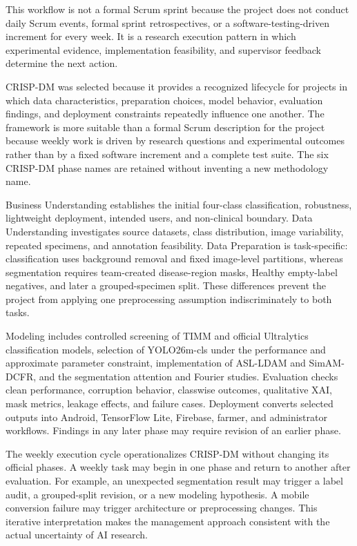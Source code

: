 \documentclass[12pt,a4paper]{report}
\begin{document}
This workflow is not a formal Scrum sprint because the project does not conduct daily Scrum events, formal sprint retrospectives, or a software-testing-driven increment for every week. It is a research execution pattern in which experimental evidence, implementation feasibility, and supervisor feedback determine the next action.\par
CRISP-DM was selected because it provides a recognized lifecycle for projects in which data characteristics, preparation choices, model behavior, evaluation findings, and deployment constraints repeatedly influence one another. The framework is more suitable than a formal Scrum description for the project because weekly work is driven by research questions and experimental outcomes rather than by a fixed software increment and a complete test suite. The six CRISP-DM phase names are retained without inventing a new methodology name.\par
Business Understanding establishes the initial four-class classification, robustness, lightweight deployment, intended users, and non-clinical boundary. Data Understanding investigates source datasets, class distribution, image variability, repeated specimens, and annotation feasibility. Data Preparation is task-specific: classification uses background removal and fixed image-level partitions, whereas segmentation requires team-created disease-region masks, Healthy empty-label negatives, and later a grouped-specimen split. These differences prevent the project from applying one preprocessing assumption indiscriminately to both tasks.\par
Modeling includes controlled screening of TIMM and official Ultralytics classification models, selection of YOLO26m-cls under the performance and approximate parameter constraint, implementation of ASL-LDAM and SimAM-DCFR, and the segmentation attention and Fourier studies. Evaluation checks clean performance, corruption behavior, classwise outcomes, qualitative XAI, mask metrics, leakage effects, and failure cases. Deployment converts selected outputs into Android, TensorFlow Lite, Firebase, farmer, and administrator workflows. Findings in any later phase may require revision of an earlier phase.\par
The weekly execution cycle operationalizes CRISP-DM without changing its official phases. A weekly task may begin in one phase and return to another after evaluation. For example, an unexpected segmentation result may trigger a label audit, a grouped-split revision, or a new modeling hypothesis. A mobile conversion failure may trigger architecture or preprocessing changes. This iterative interpretation makes the management approach consistent with the actual uncertainty of AI research.\par
\end{document}
